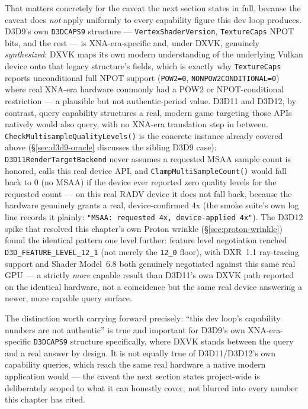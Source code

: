 That matters concretely for the caveat the next section states in full, because the caveat
does \emph{not} apply uniformly to every capability figure this dev loop produces. D3D9's own
\texttt{D3DCAPS9} structure --- \texttt{VertexShaderVersion}, \texttt{TextureCaps} NPOT bits,
and the rest --- is XNA-era-specific and, under DXVK, genuinely \emph{synthesized}: DXVK maps
its own modern understanding of the underlying Vulkan device onto that legacy structure's
fields, which is exactly why \texttt{TextureCaps} reports unconditional full NPOT support
(\texttt{POW2=0}, \texttt{NONPOW2CONDITIONAL=0}) where real XNA-era hardware commonly had a
POW2 or NPOT-conditional restriction --- a plausible but not authentic-period value. D3D11 and
D3D12, by contrast, query capability structures a real, modern game targeting those APIs
natively would also query, with no XNA-era translation step in between. \texttt{CheckMultisampleQualityLevels()}
is the concrete instance already covered above (\S\ref{sec:d3d9-oracle} discusses the sibling
D3D9 case): \texttt{D3D11RenderTargetBackend} never assumes a requested MSAA sample count is
honored, calls this real device API, and \texttt{ClampMultiSampleCount()} would fall back to
0 (no MSAA) if the device ever reported zero quality levels for the requested count --- on
this real RADV device it does not fall back, because the hardware genuinely grants a real,
device-confirmed 4x (the smoke suite's own log line records it plainly: \texttt{"MSAA:
requested 4x, device-applied 4x"}). The D3D12 spike that resolved this chapter's own Proton
wrinkle (\S\ref{sec:proton-wrinkle}) found the identical pattern one level further: feature
level negotiation reached \texttt{D3D\_FEATURE\_LEVEL\_12\_1} (not merely the \texttt{12\_0}
floor), with DXR~1.1 ray-tracing support and Shader Model~6.8 both genuinely negotiated against
this same real GPU --- a strictly \emph{more} capable result than D3D11's own DXVK path
reported on the identical hardware, not a coincidence but the same real device answering a
newer, more capable query surface.

The distinction worth carrying forward precisely: ``this dev loop's capability numbers are not
authentic'' is true and important for D3D9's own XNA-era-specific \texttt{D3DCAPS9} structure
specifically, where DXVK stands between the query and a real answer by design. It is not
equally true of D3D11/D3D12's own capability queries, which reach the same real hardware a
native modern application would --- the caveat the next section states project-wide is
deliberately scoped to what it can honestly cover, not blurred into every number this chapter
has cited.

